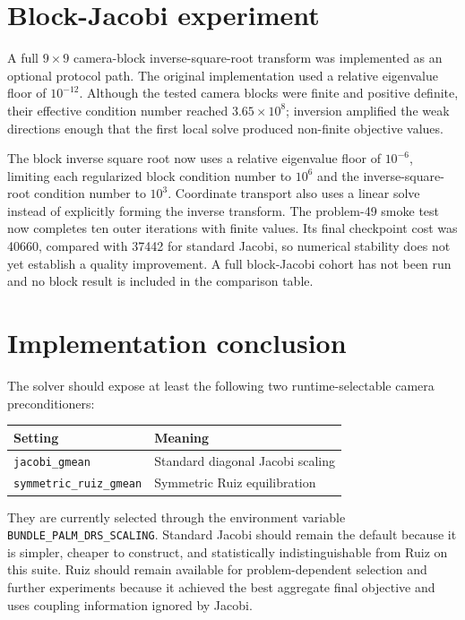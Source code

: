 \documentclass[11pt]{article}
\begin{document}
\section{Block-Jacobi experiment}

A full $9\times9$ camera-block inverse-square-root transform was implemented as
an optional protocol path.  The original implementation used a relative
eigenvalue floor of $10^{-12}$.  Although the tested camera blocks were finite
and positive definite, their effective condition number reached
$3.65\times10^8$; inversion amplified the weak directions enough that the
first local solve produced non-finite objective values.

The block inverse square root now uses a relative eigenvalue floor of
$10^{-6}$, limiting each regularized block condition number to $10^6$ and the
inverse-square-root condition number to $10^3$.  Coordinate transport also
uses a linear solve instead of explicitly forming the inverse transform.  The
problem-49 smoke test now completes ten outer iterations with finite values.
Its final checkpoint cost was 40660, compared with 37442 for standard Jacobi,
so numerical stability does not yet establish a quality improvement.  A full
block-Jacobi cohort has not been run and no block result is included in the
comparison table.

\section{Implementation conclusion}

The solver should expose at least the following two runtime-selectable camera
preconditioners:
\begin{center}
\begin{tabular}{ll}
  \toprule
  Setting & Meaning \\
  \midrule
  \texttt{jacobi\_gmean} & Standard diagonal Jacobi scaling \\
  \texttt{symmetric\_ruiz\_gmean} & Symmetric Ruiz equilibration \\
  \bottomrule
\end{tabular}
\end{center}
They are currently selected through the environment variable
\texttt{BUNDLE\_PALM\_DRS\_SCALING}.  Standard Jacobi should remain the default
because it is simpler, cheaper to construct, and statistically indistinguishable
from Ruiz on this suite.  Ruiz should remain available for problem-dependent
selection and further experiments because it achieved the best aggregate final
objective and uses coupling information ignored by Jacobi.
\end{document}
